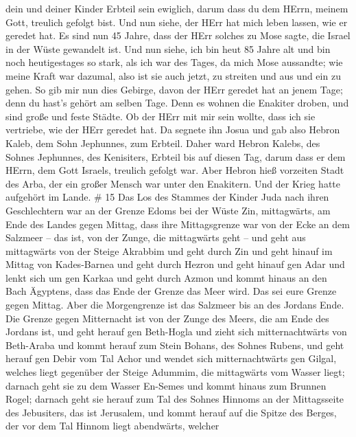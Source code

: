 dein und deiner Kinder Erbteil sein ewiglich, darum dass du dem HErrn,
meinem Gott, treulich gefolgt bist.  Und nun siehe, der
HErr hat mich leben lassen, wie er geredet hat. Es sind nun 45 Jahre,
dass der HErr solches zu Mose sagte, die Israel in der Wüste gewandelt
ist. Und nun siehe, ich bin heut 85 Jahre alt  und bin noch
heutigestages so stark, als ich war des Tages, da mich Mose aussandte;
wie meine Kraft war dazumal, also ist sie auch jetzt, zu streiten und
aus und ein zu gehen.  So gib mir nun dies Gebirge, davon
der HErr geredet hat an jenem Tage; denn du hast's gehört am selben
Tage. Denn es wohnen die Enakiter droben, und sind große und feste
Städte. Ob der HErr mit mir sein wollte, dass ich sie vertriebe, wie der
HErr geredet hat.  Da segnete ihn Josua und gab also Hebron
Kaleb, dem Sohn Jephunnes, zum Erbteil.  Daher ward Hebron
Kalebs, des Sohnes Jephunnes, des Kenisiters, Erbteil bis auf diesen
Tag, darum dass er dem HErrn, dem Gott Israels, treulich gefolgt war.
 Aber Hebron hieß vorzeiten Stadt des Arba, der ein großer
Mensch war unter den Enakitern. Und der Krieg hatte aufgehört im Lande.
\# 15  Das Los des Stammes der Kinder Juda nach ihren
Geschlechtern war an der Grenze Edoms bei der Wüste Zin, mittagwärts, am
Ende des Landes gegen Mittag,  dass ihre Mittagsgrenze war
von der Ecke an dem Salzmeer -- das ist, von der Zunge, die mittagwärts
geht --  und geht aus mittagwärts von der Steige Akrabbim
und geht durch Zin und geht hinauf im Mittag von Kades-Barnea und geht
durch Hezron und geht hinauf gen Adar und lenkt sich um gen Karkaa
 und geht durch Azmon und kommt hinaus an den Bach Ägyptens,
dass das Ende der Grenze das Meer wird. Das sei eure Grenze gegen
Mittag.  Aber die Morgengrenze ist das Salzmeer bis an des
Jordans Ende. Die Grenze gegen Mitternacht ist von der Zunge des Meers,
die am Ende des Jordans ist,  und geht herauf gen Beth-Hogla
und zieht sich mitternachtwärts von Beth-Araba und kommt herauf zum
Stein Bohans, des Sohnes Rubens,  und geht herauf gen Debir
vom Tal Achor und wendet sich mitternachtwärts gen Gilgal, welches liegt
gegenüber der Steige Adummim, die mittagwärts vom Wasser liegt; darnach
geht sie zu dem Wasser En-Semes und kommt hinaus zum Brunnen Rogel;
 darnach geht sie herauf zum Tal des Sohnes Hinnoms an der
Mittagsseite des Jebusiters, das ist Jerusalem, und kommt herauf auf die
Spitze des Berges, der vor dem Tal Hinnom liegt abendwärts, welcher
